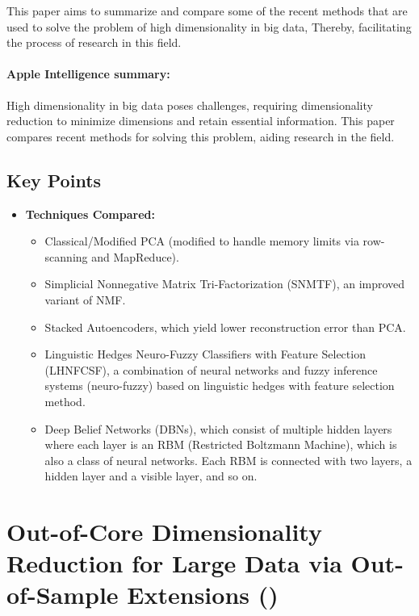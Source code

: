 \documentclass[a4paper,12pt]{article}
\begin{document}
This paper aims to summarize and compare some of the recent methods that are used to solve the problem of high dimensionality in big data, Thereby, facilitating the process of research in this field.

\paragraph{Apple Intelligence summary:} High dimensionality in big data poses challenges, requiring dimensionality reduction to minimize dimensions and retain essential information. This paper compares recent methods for solving this problem, aiding research in the field.


\subsection{Key Points}

\begin{itemize}
    \item \textbf{Techniques Compared:}
        \begin{itemize}
            \item Classical/Modified PCA (modified to handle memory limits via row-scanning and MapReduce).
            \item Simplicial Nonnegative Matrix Tri-Factorization (SNMTF), an improved variant of NMF.
            \item Stacked Autoencoders, which yield lower reconstruction error than PCA.
            \item Linguistic Hedges Neuro-Fuzzy Classifiers with Feature Selection (LHNFCSF), a combination of neural networks and fuzzy inference systems (neuro-fuzzy) based on linguistic hedges with feature selection method.
            \item Deep Belief Networks (DBNs), which consist of multiple hidden layers where each layer is an RBM (Restricted Boltzmann Machine), which is also a class of neural networks. Each RBM is connected with two layers, a hidden layer and a visible layer, and so on.
        \end{itemize}
\end{itemize}


\pagebreak
\section{Out-of-Core Dimensionality Reduction for Large Data via Out-of-Sample Extensions (\texorpdfstring{\cite{Reichmann2024}}{})}
\label{sec:reichmann2024outofcoredimensionalityreductionlarge}
\end{document}
